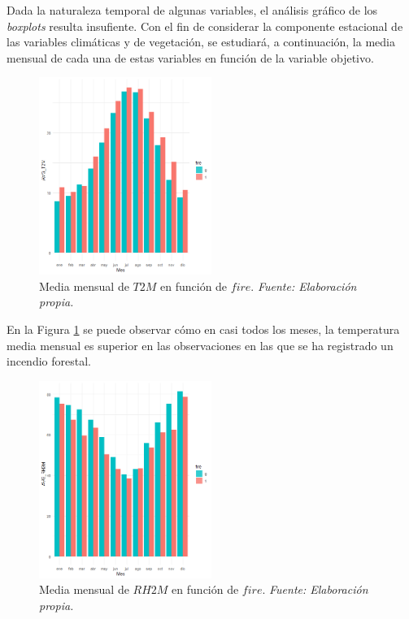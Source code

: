 \documentclass[12pt,a4paper,]{book}
\numberwithin{dummy}{section}
\theoremstyle{ocrenumbox}
\theoremstyle{blacknumex}
\theoremstyle{blacknumbox}
\theoremstyle{ocrenum}
\theoremstyle{ocrenum}
\begin{document}
Dada la naturaleza temporal de algunas variables, el análisis gráfico de
los \emph{boxplots} resulta insufiente. Con el fin de considerar la
componente estacional de las variables climáticas y de vegetación, se
estudiará, a continuación, la media mensual de cada una de estas
variables en función de la variable objetivo.

\begin{figure}[H]
\centering
\includegraphics[width = 0.5\textwidth]{graficos/T2M_mes.png}
\caption[Media mensual de $T2M$ en función de $fire$]{Media mensual de $T2M$ en función de $fire$. \it Fuente: Elaboración propia.}
\label{fig:T2M_mes}
\end{figure}

En la Figura \ref{fig:T2M_mes} se puede observar cómo en casi todos los
meses, la temperatura media mensual es superior en las observaciones en
las que se ha registrado un incendio forestal.

\begin{figure}[H]
\centering
\includegraphics[width =0.5\textwidth]{graficos/RH2M_mes.png}
\caption[Media mensual de $RH2M$ en función de  $fire$]{Media mensual de $RH2M$ en función de  $fire$. \it Fuente: Elaboración propia.}
\label{fig:RH2M_mes}
\end{figure}
\end{document}
